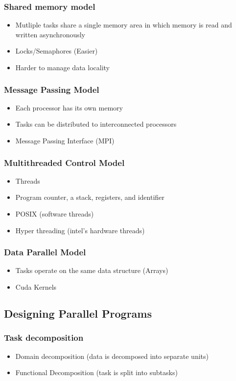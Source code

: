 \documentclass{assignments}
\begin{document}
\subsubsection*{Shared memory model}
\label{sec:orgd157b2a}
\begin{itemize}
\item Mutliple tasks share a single memory area in which memory is read and written
asynchronously
\item Locks/Semaphores (Easier)
\item Harder to manage data locality
\end{itemize}
\subsubsection*{Message Passing Model}
\label{sec:org93472a3}
\begin{itemize}
\item Each processor has its own memory
\item Tasks can be distributed to interconnected processors
\item Message Passing Interface (MPI)
\end{itemize}
\subsubsection*{Multithreaded Control Model}
\label{sec:org7e916eb}
\begin{itemize}
\item Threads
\item Program counter, a stack, registers, and identifier
\item POSIX (software threads)
\item Hyper threading (intel's hardware threads)
\end{itemize}
\subsubsection*{Data Parallel Model}
\label{sec:org1900f3f}
\begin{itemize}
\item Tasks operate on the same data structure (Arrays)
\item Cuda Kernels
\end{itemize}
\subsection*{Designing Parallel Programs}
\label{sec:orga072162}
\subsubsection*{Task decomposition}
\label{sec:org4937877}
\begin{itemize}
\item Domain decomposition (data is decomposed into separate units)
\item Functional Decomposition (task is split into subtasks)
\end{itemize}
\end{document}
